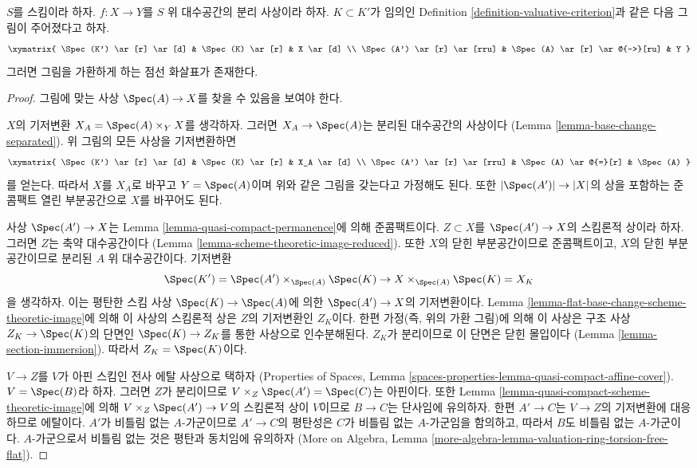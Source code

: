 \begin{lemma}
\label{lemma-push-down-solution}
$S$를 스킴이라 하자. $f : X \to Y$를 $S$ 위 대수공간의 분리 사상이라 하자.
$K \subset K'$가 임의인 Definition \ref{definition-valuative-criterion}과 같은
다음 그림이 주어졌다고 하자.
$$
\xymatrix{
\Spec(K') \ar[r] \ar[d] & \Spec(K) \ar[r] & X \ar[d] \\
\Spec(A') \ar[r] \ar[rru] & \Spec(A) \ar[r] \ar@{-->}[ru] & Y
}
$$
그러면 그림을 가환하게 하는 점선 화살표가 존재한다.
\end{lemma}

\begin{proof}
그림에 맞는 사상 $\Spec(A) \to X$를 찾을 수 있음을 보여야 한다.

\medskip\noindent
$X$의 기저변환 $X_A = \Spec(A) \times_Y X$를 생각하자.
그러면 $X_A \to \Spec(A)$는 분리된 대수공간의 사상이다
(Lemma \ref{lemma-base-change-separated}). 위 그림의 모든 사상을 기저변환하면
$$
\xymatrix{
\Spec(K') \ar[r] \ar[d] & \Spec(K) \ar[r] & X_A \ar[d] \\
\Spec(A') \ar[r] \ar[rru] & \Spec(A) \ar@{=}[r] & \Spec(A)
}
$$
를 얻는다. 따라서 $X$를 $X_A$로 바꾸고 $Y = \Spec(A)$이며 위와 같은
그림을 갖는다고 가정해도 된다. 또한 $|\Spec(A')| \to |X|$의 상을 포함하는
준콤팩트 열린 부분공간으로 $X$를 바꾸어도 된다.

\medskip\noindent
사상 $\Spec(A') \to X$는 Lemma \ref{lemma-quasi-compact-permanence}에 의해
준콤팩트이다. $Z \subset X$를 $\Spec(A') \to X$의 스킴론적 상이라 하자.
그러면 $Z$는 축약 대수공간이다
(Lemma \ref{lemma-scheme-theoretic-image-reduced}).
또한 $X$의 닫힌 부분공간이므로 준콤팩트이고, $X$의 닫힌 부분공간이므로
분리된 $A$ 위 대수공간이다. 기저변환
$$
\Spec(K') = \Spec(A') \times_{\Spec(A)} \Spec(K) \to
X \times_{\Spec(A)} \Spec(K) = X_K
$$
을 생각하자. 이는 평탄한 스킴 사상
$\Spec(K) \to \Spec(A)$에 의한 $\Spec(A') \to X$의 기저변환이다.
Lemma \ref{lemma-flat-base-change-scheme-theoretic-image}에 의해 이 사상의
스킴론적 상은 $Z$의 기저변환인 $Z_K$이다. 한편 가정(즉, 위의 가환 그림)에
의해 이 사상은 구조 사상 $Z_K \to \Spec(K)$의 단면인
$\Spec(K) \to Z_K$를 통한 사상으로 인수분해된다. $Z_K$가 분리이므로
이 단면은 닫힌 몰입이다 (Lemma \ref{lemma-section-immersion}).
따라서 $Z_K = \Spec(K)$이다.

\medskip\noindent
$V \to Z$를 $V$가 아핀 스킴인 전사 에탈 사상으로 택하자
(Properties of Spaces, Lemma
\ref{spaces-properties-lemma-quasi-compact-affine-cover}).
$V = \Spec(B)$라 하자. 그러면 $Z$가 분리이므로
$V \times_Z \Spec(A') = \Spec(C)$는 아핀이다. 또한
Lemma \ref{lemma-quasi-compact-scheme-theoretic-image}에 의해
$V \times_Z \Spec(A') \to V$의 스킴론적 상이 $V$이므로
$B \to C$는 단사임에 유의하자.
한편 $A' \to C$는 $V \to Z$의 기저변환에 대응하므로 에탈이다.
$A'$가 비틀림 없는 $A$-가군이므로 $A' \to C$의 평탄성은
$C$가 비틀림 없는 $A$-가군임을 함의하고, 따라서 $B$도 비틀림 없는
$A$-가군이다. $A$-가군으로서 비틀림 없는 것은 평탄과 동치임에 유의하자
(More on Algebra, Lemma
\ref{more-algebra-lemma-valuation-ring-torsion-free-flat}).


\end{proof}
